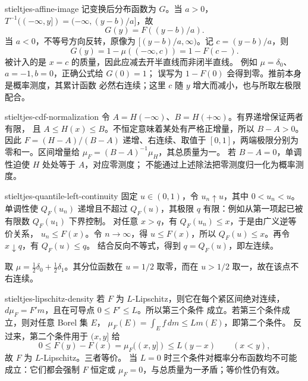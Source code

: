 \begin{solution}{stieltjes-affine-image}
记变换后分布函数为 \(G\)。当 \(a>0\)，
\(T^{-1}(({-\infty},y])=({-\infty},(y-b)/a]\)，故
\[
 G(y)=F((y-b)/a).
\]
当 \(a<0\)，不等号方向反转，原像为
\([(y-b)/a,\infty)\)。记 \(c=(y-b)/a\)，则
\[
 G(y)=1-\mu(({-\infty},c))=1-F(c-).
\]
被计入的是 \(x=c\) 的质量，因此应减去开半直线而非闭半直线。
例如 \(\mu=\delta_0\)、\(a=-1,b=0\)，正确公式给 \(G(0)=1\)；
误写为 \(1-F(0)\) 会得到零。推前本身是概率测度，其累计函数
必然右连续；这里 \(c\) 随 \(y\) 增大而减小，也与所取左极限配合。
\end{solution}

\begin{solution}{stieltjes-cdf-normalization}
令 \(A=H(-\infty)\)、\(B=H(+\infty)\)。有界递增保证两者有限，
且 \(A\le H(x)\le B\)。不恒定意味着某处有严格正增量，所以
\(B-A>0\)。因此 \(F=(H-A)/(B-A)\) 递增、右连续、取值于
\([0,1]\)，两端极限分别为零和一。区间增量给
\(\mu_F=(B-A)^{-1}\mu_H\)，其总质量为一。
若 \(B-A=0\)，单调性迫使 \(H\) 处处等于 \(A\)，对应零测度；
不能通过上述除法把零测度归一化为概率测度。
\end{solution}

\begin{solution}{stieltjes-quantile-left-continuity}
固定 \(u\in(0,1)\)，令 \(u_n\uparrow u\)，其中 \(0<u_n<u\)。
单调性使 \(Q_F(u_n)\) 递增且不超过 \(Q_F(u)\)，其极限 \(q\)
有限：例如从第一项起已被有限数 \(Q_F(u_1)\) 下界控制。
对任意 \(x>q\)，有 \(Q_F(u_n)\le x\)，于是由广义逆等价关系，
\(u_n\le F(x)\)。令 \(n\to\infty\)，得 \(u\le F(x)\)，所以
\(Q_F(u)\le x\)。再令 \(x\downarrow q\)，有 \(Q_F(u)\le q\)。
结合反向不等式，得到 \(q=Q_F(u)\)，即左连续。

取 \(\mu=\tfrac12\delta_0+\tfrac12\delta_1\)。其分位函数在
\(u=1/2\) 取零，而在 \(u>1/2\) 取一，故在该点不右连续。
\end{solution}

\begin{solution}{stieltjes-lipschitz-density}
若 \(F\) 为 \(L\)-Lipschitz，则它在每个紧区间绝对连续，
\(d\mu_F=F'm\)，且在可导点 \(0\le F'\le L\)。所以第三个条件
成立。若第三个条件成立，则对任意 Borel 集 \(E\)，
\(\mu_F(E)=\int_Ef\,dm\le Lm(E)\)，即第二个条件。
反过来，第二个条件用于 \((x,y]\) 给
\[
 0\le F(y)-F(x)=\mu_F((x,y])\le L(y-x)\qquad(x<y),
\]
故 \(F\) 为 \(L\)-Lipschitz。三者等价。
当 \(L=0\) 时三个条件对概率分布函数均不可能成立：它们都会强制
\(F\) 恒定或 \(\mu_F=0\)，与总质量为一矛盾；等价性仍有效。
\end{solution}


